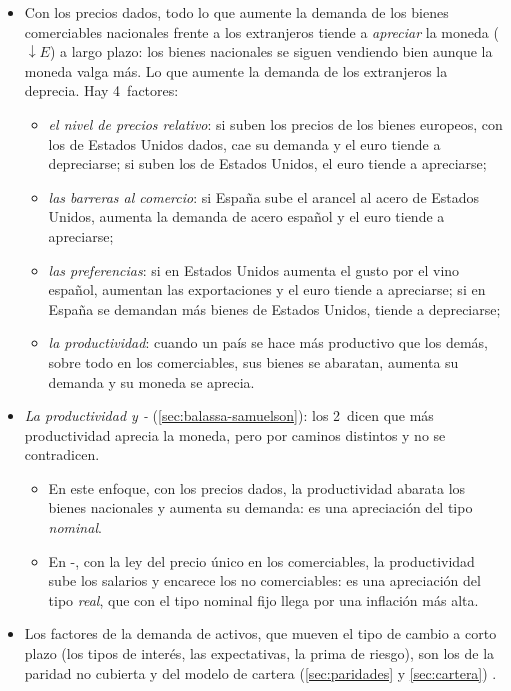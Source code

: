 \documentclass[11pt]{article}
\begin{document}
\begin{itemize}
\item Con los precios dados, todo lo que aumente la demanda de los bienes comerciables nacionales frente a los extranjeros tiende a \emph{apreciar} la moneda ($\downarrow E$) a largo plazo: los bienes nacionales se siguen vendiendo bien aunque la moneda valga más. Lo que aumente la demanda de los extranjeros la deprecia\nocite{MishkinMatthewsGiuliodori2013}. Hay 4~factores:
  \begin{itemize}
  \item \emph{el nivel de precios relativo}: si suben los precios de los bienes europeos, con los de Estados Unidos dados, cae su demanda y el euro tiende a depreciarse; si suben los de Estados Unidos, el euro tiende a apreciarse;
  \item \emph{las barreras al comercio}: si España sube el arancel al acero de Estados Unidos, aumenta la demanda de acero español y el euro tiende a apreciarse;
  \item \emph{las preferencias}: si en Estados Unidos aumenta el gusto por el vino español, aumentan las exportaciones y el euro tiende a apreciarse; si en España se demandan más bienes de Estados Unidos, tiende a depreciarse;
  \item \emph{la productividad}: cuando un país se hace más productivo que los demás, sobre todo en los comerciables, sus bienes se abaratan, aumenta su demanda y su moneda se aprecia.
  \end{itemize}
\item \emph{La productividad y -} (\ref{sec:balassa-samuelson}): los 2~dicen que más productividad aprecia la moneda, pero por caminos distintos y no se contradicen.
  \begin{itemize}
  \item En este enfoque, con los precios dados, la productividad abarata los bienes nacionales y aumenta su demanda: es una apreciación del tipo \emph{nominal}.
  \item En -, con la ley del precio único en los comerciables, la productividad sube los salarios y encarece los no comerciables: es una apreciación del tipo \emph{real}, que con el tipo nominal fijo llega por una inflación más alta.
  \end{itemize}
\item Los factores de la demanda de activos, que mueven el tipo de cambio a corto plazo (los tipos de interés, las expectativas, la prima de riesgo), son los de la paridad no cubierta y del modelo de cartera (\ref{sec:paridades} y \ref{sec:cartera}) .
\end{itemize}
\end{document}
